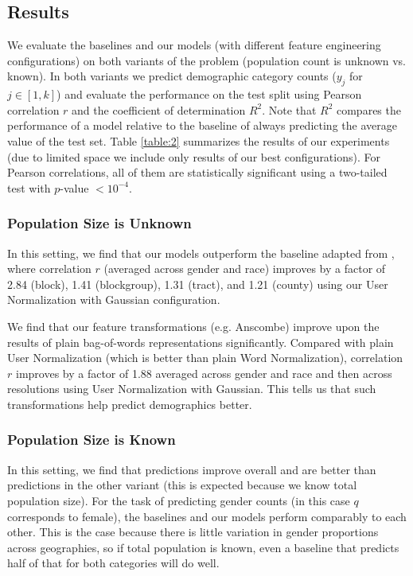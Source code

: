 \documentclass[letterpaper]{article}
\begin{document}
\subsection{Results}
We evaluate the baselines and our models (with different feature engineering configurations) on both variants of the problem (population count is unknown vs. known). In both variants we predict demographic category counts ($y_j$ for $j \in[1,k]$) and evaluate the performance on the test split using Pearson correlation $r$ and the coefficient of determination $R^2$. Note that $R^2$ compares the performance of a model relative to the baseline of always predicting the average value of the test set. Table \ref{table:2} summarizes the results of our experiments (due to limited space we include only results of our best configurations). For Pearson correlations, all of them are statistically significant using a two-tailed test with $p$-value $< 10^{-4}$. 

\subsubsection{Population Size is Unknown} In this setting, we find that our models outperform the baseline adapted from \cite{mohammady2014using}, where correlation $r$ (averaged across gender and race) improves by a factor of 2.84 (block), 1.41 (blockgroup), 1.31 (tract), and 1.21 (county) using our User Normalization with Gaussian configuration.

We find that our feature transformations (e.g. Anscombe) improve upon the results of plain bag-of-words representations significantly. Compared with plain User Normalization (which is better than plain Word Normalization), correlation $r$ improves by a factor of 1.88 averaged across gender and race and then across resolutions using User Normalization with Gaussian. This tells us that such transformations help predict demographics better. 

\subsubsection{Population Size is Known} In this setting, we find that predictions improve overall and are better than predictions in the other variant (this is expected because we know total population size). For the task of predicting gender counts (in this case $q$ corresponds to female), the baselines and our models perform comparably to each other. This is the case because there is little variation in gender proportions across geographies, so if total population is known, even a baseline that predicts half of that for both categories will do well.
\end{document}
